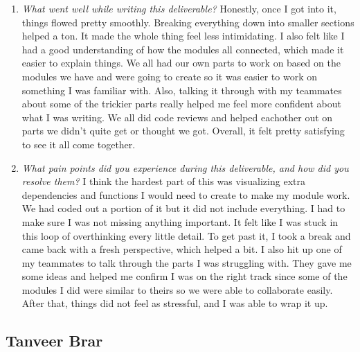 \documentclass[12pt, titlepage]{article}
\begin{document}
\begin{enumerate}
  \item \textit{What went well while writing this deliverable? }
  Honestly, once I got into it, things flowed pretty smoothly. Breaking everything down into 
  smaller sections helped a ton. It made the whole thing feel less intimidating. I also felt like 
  I had a good understanding of how the modules all connected, which made it easier to explain things.
  We all had our own parts to work on based on the modules we have and were going to create so it was easier to 
  work on something I was familiar with. Also, talking it through with my teammates about some of the trickier 
  parts really helped me feel more confident about what I was writing. We all did code reviews and helped eachother out on
  parts we didn't quite get or thought we got. Overall, it felt pretty satisfying to see it all come together.
  
  \item \textit{What pain points did you experience during this deliverable, and how did you resolve them?}
  I think the hardest part of this was visualizing extra dependencies and functions I would need to create to make my 
  module work. We had coded out a portion of it but it did not include everything. I had to make sure I was not missing 
  anything important. It felt like I was stuck in this loop of overthinking every little detail. To get past it, I took a 
  break and came back with a fresh perspective, which helped a bit. I also hit up one of my teammates to talk through the 
  parts I was struggling with. They gave me some ideas and helped me confirm I was on the right track since some of the 
  modules I did were similar to theirs so we were able to collaborate easily. After that, things did not feel as stressful, 
  and I was able to wrap it up.
  
\end{enumerate}

\subsection*{Tanveer Brar}
\end{document}
